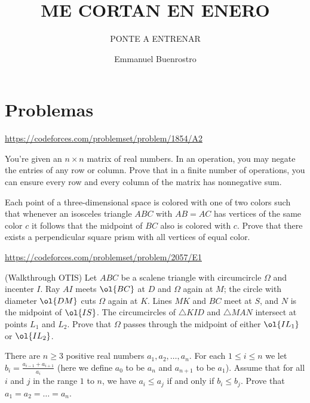 \documentclass[11pt]{scrartcl}
\title{ME CORTAN EN ENERO }
\subtitle{PONTE A ENTRENAR}
\author{Emmanuel Buenrostro}
\begin{document}
\maketitle

\section{Problemas}
\begin{problem}[CF 1854A2]
\url{https://codeforces.com/problemset/problem/1854/A2}
\end{problem}
\begin{problem}
  You're given an $n \times n$ matrix of real numbers.
  In an operation, you may negate the entries of any row or column.
  Prove that in a finite number of operations,
  you can ensure every row and every column of the matrix has nonnegative sum.
\end{problem}
\begin{problem}
   Each point of a three-dimensional space is colored
  with one of two colors such that
  whenever an isosceles triangle $ABC$ with $AB = AC$
  has vertices of the same color $c$ it follows that
  the midpoint of $BC$ also is colored with $c$.
  Prove that there exists a perpendicular square prism
  with all vertices of equal color.
\end{problem}
\begin{problem}[CF 2057E1]
\url{https://codeforces.com/problemset/problem/2057/E1}
\end{problem}
\begin{problem}[USAMO 2017/3]
  (Walkthrough OTIS)
  Let $ABC$ be a scalene triangle with circumcircle $\Omega$ and incenter $I$.
  Ray $AI$ meets $\ol{BC}$ at $D$ and $\Omega$ again at $M$;
  the circle with diameter $\ol{DM}$ cuts $\Omega$ again at $K$.
  Lines $MK$ and $BC$ meet at $S$, and $N$ is the midpoint of $\ol{IS}$.
  The circumcircles of $\triangle KID$ and $\triangle MAN$
  intersect at points $L_1$ and $L_2$.
  Prove that $\Omega$ passes through the midpoint of either $\ol{IL_1}$ or $\ol{IL_2}$.
\end{problem}
\begin{problem}[EGMO 2023/1]
	There are $n \ge 3$ positive real numbers $a_1, a_2, \dots, a_n$. For each $1 \le i \le n$ we let $b_i = \frac{a_{i-1} + a_{i+1}}{a_i}$ (here we define $a_0$ to be $a_n$ and $a_{n+1}$ to be $a_1$). Assume that for all $i$ and $j$ in the range $1$ to $n$, we have $a_i \le a_j$ if and only if $b_i \le b_j$.
Prove that $a_1 = a_2 = \dots = a_n$.
\end{problem}
\end{document}
